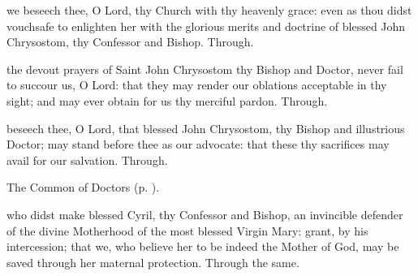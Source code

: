 \vspace{-0.15\baselineskip}

\collect

\vspace{-0.1\baselineskip}

 we beseech thee, O Lord, thy Church with thy heavenly grace: even as thou didst vouchsafe to enlighten her with the glorious merits and doctrine of blessed John Chrysostom, thy Confessor and Bishop. Through.


\tractnotice
{}

\vspace{-0.15\baselineskip}

\secret

\vspace{-0.1\baselineskip}

 the devout prayers of Saint John Chrysostom thy Bishop and Doctor, never fail to succour us, O Lord: that they may render our oblations acceptable in thy sight; and may ever obtain for us thy merciful pardon. Through.

\postcommunion
{} beseech thee, O Lord, that blessed John Chrysostom, thy Bishop and illustrious Doctor; may stand before thee as our advocate: that these thy sacrifices may avail for our salvation. Through.



\begin{rubric}
	The Common of Doctors (p. \pageref{CommonDoctors}).
\end{rubric}

\collect
{} who didst make blessed Cyril, thy Confessor and Bishop, an invincible defender of the divine Motherhood of the most blessed Virgin Mary: grant, by his intercession; that we, who believe her to be indeed the Mother of God, may be saved through her maternal protection. Through the same.

